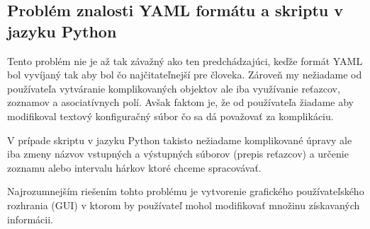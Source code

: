 \subsection{Problém znalosti YAML formátu a skriptu v jazyku Python}

Tento problém nie je až tak závažný ako ten predchádzajúci, keďže formát YAML bol vyvíjaný tak aby bol čo najčitateľnejší pre človeka. Zároveň my nežiadame od používateľa vytváranie komplikovaných objektov ale iba využívanie reťazcov, zoznamov a asociatívnych polí. Avšak faktom je, že od používateľa žiadame aby modifikoval textový konfiguračný súbor čo sa dá považovať za komplikáciu.

V prípade skriptu v jazyku Python takisto nežiadame komplikované úpravy ale iba zmeny názvov vstupných a výstupných súborov (prepis reťazcov) a určenie zoznamu alebo intervalu hárkov ktoré chceme spracovávať.

Najrozumnejším riešením tohto problému je vytvorenie grafického používateľského rozhrania (GUI) v ktorom by používateľ mohol modifikovať množinu získavaných informácii. 